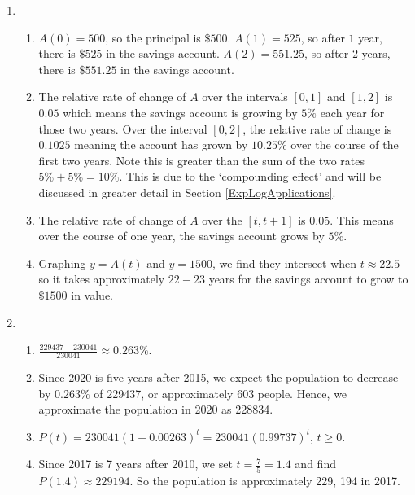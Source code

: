 \documentclass{ximera}
\begin{document}
\begin{enumerate}
\setcounter{enumi}{\value{HW}}

\item  \begin{enumerate}

\item   $A(0) = 500$, so the principal is $\$500$.  $A(1) = 525$, so after $1$ year, there is $\$525$ in the savings account.   $A(2) =551.25$, so after $2$ years, there is $\$551.25$ in the savings account. 

\item  The relative rate of change of $A$ over the intervals $[0,1]$ and $[1,2]$ is $0.05$ which means the savings account is growing by $5 \%$ each year for those two years.  Over the interval $[0,2]$, the relative rate of change is $0.1025$ meaning the account has grown by $10.25 \%$ over the course of the first two years.  Note this is greater than the sum of the two rates $5 \% + 5 \% = 10 \%$.  This is due to the `compounding effect' and will be discussed in greater detail in Section \ref{ExpLogApplications}.

\item  The relative rate of change of $A$ over the $[t, t+1]$ is $0.05$. This means over the course of one year, the savings account grows by $5 \%$.

\item Graphing $y= A(t)$ and $y = 1500$, we find they intersect when $t \approx 22.5$ so it takes approximately $22-23$ years for the savings account to grow to $\$1500$ in value.

\end{enumerate}

\item  \begin{enumerate}

\item $\frac{229437-230041}{230041} \approx 0.263 \%$.

\item  Since 2020 is five years after 2015, we expect the population to decrease by  $0.263 \%$ of 229437, or approximately 603 people.  Hence, we approximate the population in 2020 as 228834.

\item  $P(t) = 230041(1-0.00263)^t = 230041(0.99737)^{t}$, $t \geq 0$.

\item  Since 2017 is 7 years after 2010, we set $t = \frac{7}{5} = 1.4$ and find $P(1.4) \approx 229194$.  So the population is approximately 229, 194 in 2017.  


\end{enumerate}
\end{enumerate}
\end{document}
